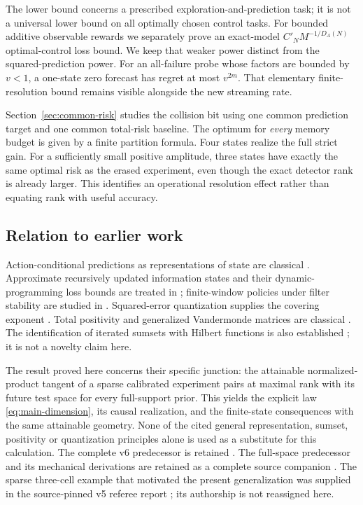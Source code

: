 The lower bound concerns a prescribed exploration-and-prediction task;
it is not a universal lower bound on all optimally chosen control tasks.
For bounded additive observable rewards we separately prove an exact-model
$C'_NM^{-1/D_A(N)}$ optimal-control loss bound. We keep that weaker
power distinct from the squared-prediction power. For an all-failure probe
whose factors are bounded by $v<1$, a one-state zero forecast has regret
at most $v^{2m}$. That elementary finite-resolution bound remains visible
alongside the new streaming rate.

Section~\ref{sec:common-risk} studies the collision bit using one common
prediction target and one common total-risk baseline. The optimum for
\emph{every} memory budget is given by a finite partition formula. Four
states realize the full strict gain. For a sufficiently small positive
amplitude, three states have exactly the same optimal risk as the erased
experiment, even though the exact detector rank is already larger. This
identifies an operational resolution effect rather than equating rank with
useful accuracy.

\subsection{Relation to earlier work}
Action-conditional predictions as representations of state are classical
\cite{LittmanSutton}. Approximate recursively updated information states
and their dynamic-programming loss bounds are treated in
\cite{Subramanian}; finite-window policies under filter stability are
studied in \cite{KaraYuksel}. Squared-error quantization supplies the
covering exponent \cite{GrafLuschgy}. Total positivity and generalized
Vandermonde matrices are classical \cite{Pinkus}. The identification of
iterated sumsets with Hilbert functions is also established
\cite{EliahouMazumdar,Elias}; it is not a novelty claim here.

The result proved here concerns their specific junction: the attainable
normalized-product tangent of a sparse calibrated experiment pairs at
maximal rank with its future test space for every full-support prior.
This yields the explicit law \eqref{eq:main-dimension}, its causal
realization, and the finite-state consequences with the same attainable
geometry. None of the cited general representation, sumset, positivity or
quantization principles alone is used as a substitute for this calculation.
The complete v6 predecessor is retained \cite{A1v6}. The full-space
predecessor and its mechanical derivations are retained
as a complete source companion \cite{A1v5}. The sparse three-cell example
that motivated the present generalization was supplied in the source-pinned
v5 referee report \cite{A1review}; its authorship is not reassigned here.

